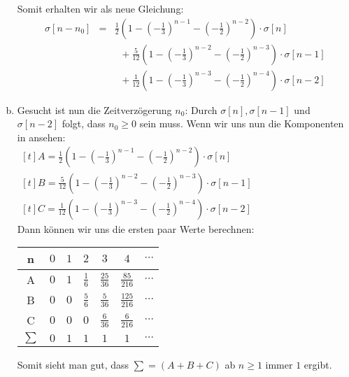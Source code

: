 \begin{uebsp}
\begin{Answer}
\begin{enumerate}[a)]
        Somit erhalten wir als neue Gleichung:
        \begin{eqnarray}
            \sigma[n-n_0]&=&\frac{1}{2}\left(1-\left(-\frac{1}{3}\right)^{n-1}-\left(-\frac{1}{2}\right)^{n-2}\right)\cdot
            \sigma[n]\\
                &&\;\;+\frac{5}{12}\left(1-\left(-\frac{1}{3}\right)^{n-2}-\left(-\frac{1}{2}\right)^{n-3}\right)\cdot
                \sigma[n-1]\\
                &&\;\;+\frac{1}{12}\left(1-\left(-\frac{1}{3}\right)^{n-3}-\left(-\frac{1}{2}\right)^{n-4}\right)\cdot
                \sigma[n-2]
            \label{eq:komponenten}
        \end{eqnarray}

        \item Gesucht ist nun die Zeitverzögerung $n_0$:
            Durch $\sigma[n], \sigma[n-1]$ und $\sigma[n-2]$ folgt, dass
            $n_0\geq 0$ sein muss.
            Wenn wir uns nun die Komponenten in  ansehen:\\
            $\begin{aligned}[t]A=\frac{1}{2}\left(1-\left(-\frac{1}{3}\right)^{n-1}-\left(-\frac{1}{2}\right)^{n-2}\right)\cdot
                \sigma[n]\end{aligned}$\\
            $\begin{aligned}[t]B=\frac{5}{12}\left(1-\left(-\frac{1}{3}\right)^{n-2}-\left(-\frac{1}{2}\right)^{n-3}\right)\cdot
                \sigma[n-1]\end{aligned}$\\
            $\begin{aligned}[t]C=\frac{1}{12}\left(1-\left(-\frac{1}{3}\right)^{n-3}-\left(-\frac{1}{2}\right)^{n-4}\right)\cdot
                \sigma[n-2]\end{aligned}$\\
           Dann können wir uns die ersten paar Werte berechnen:
           \begin{center}
           \begin{tabular}{c|cccccc}
            n&  $0$&  $1$    &$2$    &$3$  &$4$ &$\cdots$\\
            \hline
            A&$0$&$1$&$\frac{1}{6}$&$\frac{25}{36}$&$\frac{85}{216}$&$\cdots$\\
            B&$0$&$0$&$\frac{5}{6}$&$\frac{5}{36}$&$\frac{125}{216}$&$\cdots$\\
            C&$0$&$0$&$0$&$\frac{6}{36}$&$\frac{6}{216}$&$\cdots$\\
            \hline
            $\sum$&$0$&$1$&$1$&$1$&$1$&$\cdots$\\
           \end{tabular}
           \end{center}
           Somit sieht man gut, dass $\sum=(A+B+C)$ ab $n\geq1$ immer $1$ ergibt.
           

\end{enumerate}
\end{Answer}
\end{uebsp}
